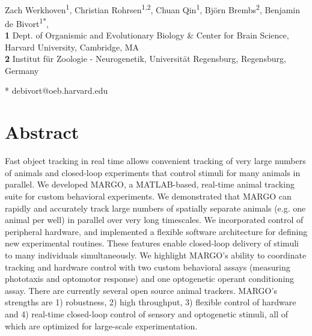 \documentclass[10pt,letterpaper]{article}
\begin{document}
\vspace*{0.2in}

\begin{flushleft}
{\Large
\textbf{} %
}
\newline
\\
Zach Werkhoven\textsuperscript{1},
Christian Rohrsen\textsuperscript{1,2},
Chuan Qin\textsuperscript{1},
Björn Brembs\textsuperscript{2},
Benjamin de Bivort\textsuperscript{1*},
\\
\bigskip
\textbf{1} Dept. of Organismic and Evolutionary Biology \& Center for Brain Science, Harvard University, Cambridge, MA
\\
\textbf{2} Institut für Zoologie - Neurogenetik, Universität Regensburg, Regensburg, Germany
\\
\bigskip

* debivort@oeb.harvard.edu

\end{flushleft}
\section*{Abstract}
Fast object tracking in real time allows convenient tracking of very large numbers of animals and closed-loop experiments that control stimuli for many animals in parallel. We developed MARGO, a MATLAB-based, real-time animal tracking suite for custom behavioral experiments. We demonstrated that MARGO can rapidly and accurately track large numbers of spatially separate animals (e.g. one animal per well) in parallel over very long timescales. We incorporated control of peripheral hardware, and implemented a flexible software architecture for defining new experimental routines. These features enable closed-loop delivery of stimuli to many individuals simultaneously. We highlight MARGO's ability to coordinate tracking and hardware control with two custom behavioral assays (measuring phototaxis and optomotor response) and one optogenetic operant conditioning assay. There are currently several open source animal trackers. MARGO’s strengths are 1) robustness, 2) high throughput, 3) flexible control of hardware and 4) real-time closed-loop control of sensory and optogenetic stimuli, all of which are optimized for large-scale experimentation.
\end{document}
